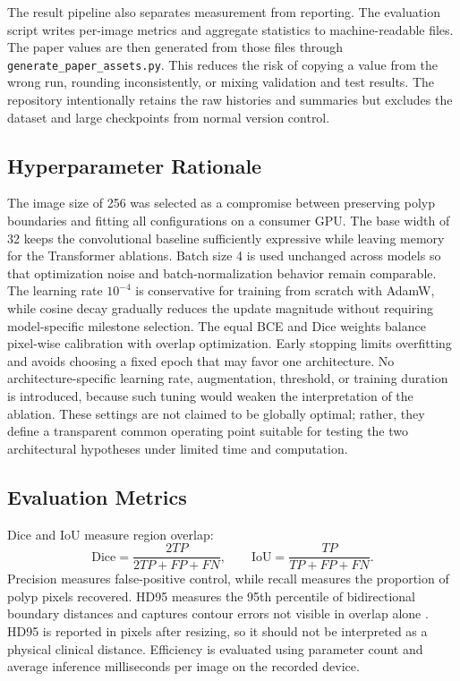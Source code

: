 \documentclass[a4paper,10pt]{article}
\begin{document}
The result pipeline also separates measurement from reporting. The evaluation script writes per-image metrics and aggregate statistics to machine-readable files. The paper values are then generated from those files through \texttt{generate\_paper\_assets.py}. This reduces the risk of copying a value from the wrong run, rounding inconsistently, or mixing validation and test results. The repository intentionally retains the raw histories and summaries but excludes the dataset and large checkpoints from normal version control.

\subsection{Hyperparameter Rationale}

The image size of 256 was selected as a compromise between preserving polyp boundaries and fitting all configurations on a consumer GPU. The base width of 32 keeps the convolutional baseline sufficiently expressive while leaving memory for the Transformer ablations. Batch size 4 is used unchanged across models so that optimization noise and batch-normalization behavior remain comparable. The learning rate $10^{-4}$ is conservative for training from scratch with AdamW, while cosine decay gradually reduces the update magnitude without requiring model-specific milestone selection. The equal BCE and Dice weights balance pixel-wise calibration with overlap optimization. Early stopping limits overfitting and avoids choosing a fixed epoch that may favor one architecture. No architecture-specific learning rate, augmentation, threshold, or training duration is introduced, because such tuning would weaken the interpretation of the ablation. These settings are not claimed to be globally optimal; rather, they define a transparent common operating point suitable for testing the two architectural hypotheses under limited time and computation.

\subsection{Evaluation Metrics}

Dice and IoU measure region overlap:
\begin{equation}
\mathrm{Dice}=\frac{2TP}{2TP+FP+FN},\qquad
\mathrm{IoU}=\frac{TP}{TP+FP+FN}.
\end{equation}
Precision measures false-positive control, while recall measures the proportion of polyp pixels recovered. HD95 measures the 95th percentile of bidirectional boundary distances and captures contour errors not visible in overlap alone \cite{taha2015metrics}. HD95 is reported in pixels after resizing, so it should not be interpreted as a physical clinical distance. Efficiency is evaluated using parameter count and average inference milliseconds per image on the recorded device.
\end{document}
